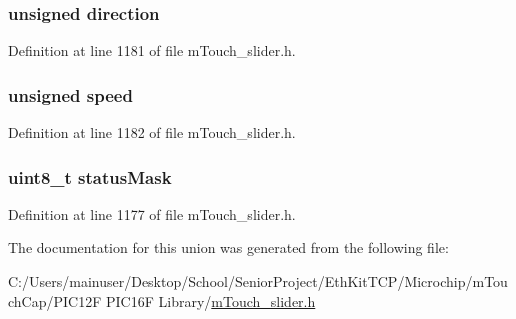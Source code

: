 \subsubsection[{direction}]{\setlength{\rightskip}{0pt plus 5cm}unsigned direction}\label{unionm_touch__wheel_status_a8e014f2c07c757619aefc8ff1024004c}


Definition at line 1181 of file m\+Touch\+\_\+slider.\+h.

\hypertarget{unionm_touch__wheel_status_a6f9843b883df5426450c0095d8892732}{}
\subsubsection[{speed}]{\setlength{\rightskip}{0pt plus 5cm}unsigned speed}\label{unionm_touch__wheel_status_a6f9843b883df5426450c0095d8892732}


Definition at line 1182 of file m\+Touch\+\_\+slider.\+h.

\hypertarget{unionm_touch__wheel_status_a05ac72aa6b98b42dfe3f0a8d13848480}{}
\subsubsection[{status\+Mask}]{\setlength{\rightskip}{0pt plus 5cm}uint8\+\_\+t status\+Mask}\label{unionm_touch__wheel_status_a05ac72aa6b98b42dfe3f0a8d13848480}


Definition at line 1177 of file m\+Touch\+\_\+slider.\+h.



The documentation for this union was generated from the following file\+:\begin{DoxyCompactItemize}
\item 
C\+:/\+Users/mainuser/\+Desktop/\+School/\+Senior\+Project/\+Eth\+Kit\+T\+C\+P/\+Microchip/m\+Touch\+Cap/\+P\+I\+C12\+F P\+I\+C16\+F Library/\hyperlink{m_touch__slider_8h}{m\+Touch\+\_\+slider.\+h}\end{DoxyCompactItemize}
